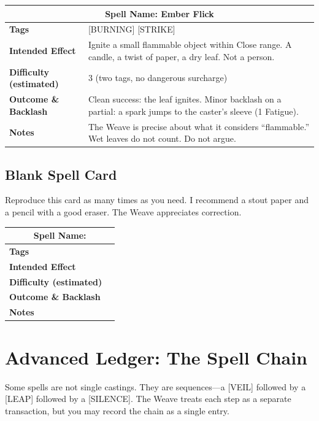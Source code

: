 \noindent
\begin{tabular}{|p{}|p{}|}
\hline
\multicolumn{2}{|c|}{\textbf{Spell Name: Ember Flick}}\\
\hline
\textbf{Tags} & [BURNING] [STRIKE] \\
\hline
\textbf{Intended Effect} & Ignite a small flammable object within Close range. A candle, a twist of paper, a dry leaf. Not a person. \\
\hline
\textbf{Difficulty (estimated)} & 3 (two tags, no dangerous surcharge) \\
\hline
\textbf{Outcome \& Backlash} & Clean success: the leaf ignites. Minor backlash on a partial: a spark jumps to the caster's sleeve (1 Fatigue). \\
\hline
\textbf{Notes} & The Weave is precise about what it considers ``flammable.'' Wet leaves do not count. Do not argue. \\
\hline
\end{tabular}

\subsection{Blank Spell Card}

Reproduce this card as many times as you need. I recommend a stout paper and a pencil with a good eraser. The Weave appreciates correction.

\noindent
\begin{tabular}{|p{}|p{}|}
\hline
\multicolumn{2}{|c|}{\textbf{Spell Name: }}\\
\hline
\textbf{Tags} & \\
\hline
\textbf{Intended Effect} & \\
\hline
\textbf{Difficulty (estimated)} & \\
\hline
\textbf{Outcome \& Backlash} & \\
\hline
\textbf{Notes} & \\
\hline
\end{tabular}

\section{Advanced Ledger: The Spell Chain}

Some spells are not single castings. They are sequences---a [VEIL] followed by a [LEAP] followed by a [SILENCE]. The Weave treats each step as a separate transaction, but you may record the chain as a single entry.

